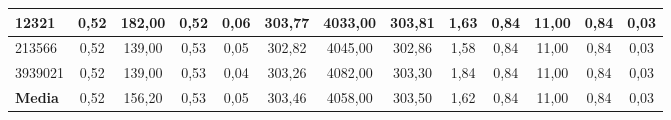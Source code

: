 \documentclass[12pt, spanish]{article}
\begin{document}
\begin{table}[H]
\begin{adjustwidth}{-1cm}{-1cm}
\begin{tabular}{|l|c|c|c|c|c|c|c|c|c|c|c|c|}
12321                                                   & 0,52                         & 182,00                         & 0,52                      & 0,06                   & 303,77                       & 4033,00                        & 303,81                    & 1,63                   & 0,84                         & 11,00                          & 0,84                      & 0,03                   \\ \hline
213566                                                  & 0,52                         & 139,00                         & 0,53                      & 0,05                   & 302,82                       & 4045,00                        & 302,86                    & 1,58                   & 0,84                         & 11,00                          & 0,84                      & 0,03                   \\ \hline
3939021                                                 & 0,52                         & 139,00                         & 0,53                      & 0,04                   & 303,26                       & 4082,00                        & 303,30                    & 1,84                   & 0,84                         & 11,00                          & 0,84                      & 0,03                   \\ \hline
\textbf{Media}                                          & 0,52                         & 156,20                         & 0,53                      & 0,05                   & 303,46                       & 4058,00                        & 303,50                    & 1,62                   & 0,84                         & 11,00                          & 0,84                      & 0,03                   \\ \hline
\end{tabular}
\end{adjustwidth}

\end{table}
\end{document}
